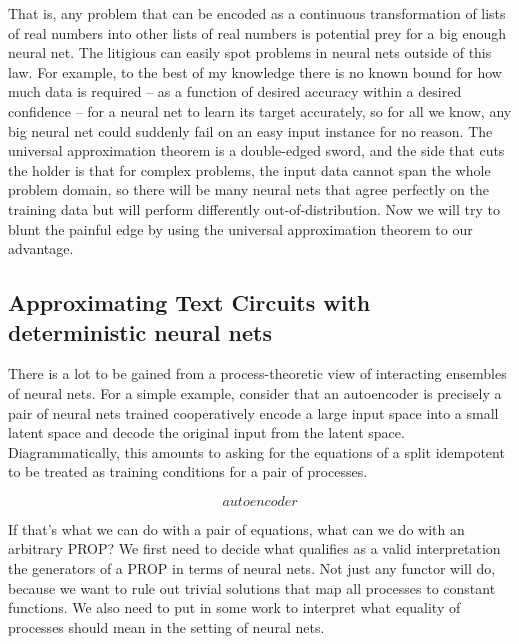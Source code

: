 \begin{fullwidth}
That is, any problem that can be encoded as a continuous transformation of lists of real numbers into other lists of real numbers is potential prey for a big enough neural net. The litigious can easily spot problems in neural nets outside of this law. For example, to the best of my knowledge there is no known bound for how much data is required -- as a function of desired accuracy within a desired confidence -- for a neural net to learn its target accurately, so for all we know, any big neural net could suddenly fail on an easy input instance for no reason. The universal approximation theorem is a double-edged sword, and the side that cuts the holder is that for complex problems, the input data cannot span the whole problem domain, so there will be many neural nets that agree perfectly on the training data but will perform differently out-of-distribution. Now we will try to blunt the painful edge by using the universal approximation theorem to our advantage.

\subsection{Approximating Text Circuits with deterministic neural nets}

There is a lot to be gained from a process-theoretic view of interacting ensembles of neural nets. For a simple example, consider that an autoencoder is precisely a pair of neural nets trained cooperatively encode a large input space into a small latent space and decode the original input from the latent space. Diagrammatically, this amounts to asking for the equations of a split idempotent to be treated as training conditions for a pair of processes.

\[autoencoder\]

If that's what we can do with a pair of equations, what can we do with an arbitrary PROP? We first need to decide what qualifies as a valid interpretation the generators of a PROP in terms of neural nets. Not just any functor will do, because we want to rule out trivial solutions that map all processes to constant functions. We also need to put in some work to interpret what equality of processes should mean in the setting of neural nets.


\end{fullwidth}
